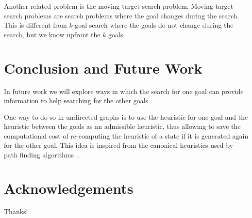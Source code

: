 \documentclass{aicom2e}
\newcommand{\kgs}{$k$-goal search}
\begin{document}
Another related problem is the moving-target search problem. Moving-target search problems are search problems where the goal changes during the search. This is different from \kgs{} where the goals do not change during the search, but we know upfront the $k$ goals. 

\section{Conclusion and Future Work}



In future work we will explore ways in which the search for one goal 
can provide information to help searching for the other goals. 

One way to do so in undirected graphs is to use the heuristic for one goal and the 
heuristic between the goals as an admissible heuristic, thus allowing to save the computational cost of re-computing the heuristic of a state if it is generated again for the other goal. This idea is inspired from the canonical heuristics used by path finding algorithms~\cite{canonical}.




\section*{Acknowledgements}
Thanks!



\end{document}

